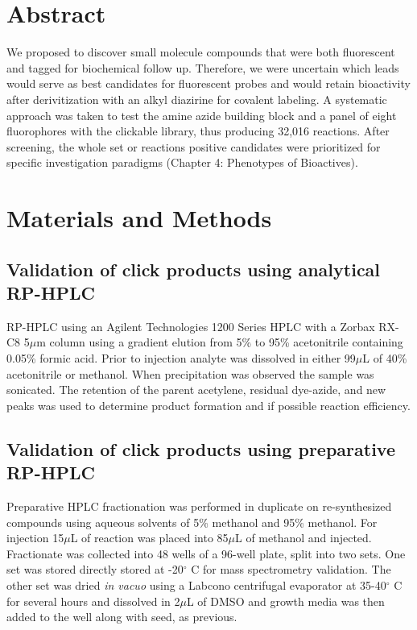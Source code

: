\section{Abstract}

We proposed to discover small molecule compounds that were both fluorescent and tagged for biochemical follow up. Therefore, we were uncertain which leads would serve as best candidates for fluorescent probes and would retain bioactivity after derivitization with an alkyl diazirine for covalent labeling. A systematic approach was taken to test the amine azide building block and a panel of eight fluorophores with the clickable library, thus producing 32,016 reactions. After screening, the whole set or reactions positive candidates were prioritized for specific investigation paradigms (Chapter 4: Phenotypes of Bioactives).

\section{Materials and Methods}

\subsection{Validation of click products using analytical RP-HPLC}

RP-HPLC using an Agilent Technologies 1200 Series HPLC with a Zorbax RX-C8 5$\mu$m column using a gradient elution from 5{\%} to 95{\%} acetonitrile containing 0.05{\%} formic acid. Prior to injection analyte was dissolved in either 99$\mu$L of 40{\%} acetonitrile or methanol. When precipitation was observed the sample was sonicated. The retention of the parent acetylene, residual dye-azide, and new peaks was used to determine product formation and if possible reaction efficiency.


\subsection{Validation of click products using preparative RP-HPLC}

Preparative HPLC fractionation was performed in duplicate on re-synthesized compounds using aqueous solvents of 5{\%} methanol and 95{\%} methanol. For injection 15$\mu$L of reaction was placed into 85$\mu$L of methanol and injected. Fractionate was collected into 48 wells of a 96-well plate, split into two sets. One set was stored directly stored at -20${}^\circ$ C for mass spectrometry validation. The other set was dried {\it in vacuo} using a Labcono centrifugal evaporator at 35-40${}^\circ$ C for several hours and dissolved in 2$\mu$L of DMSO and growth media was then added to the well along with seed, as previous. 

